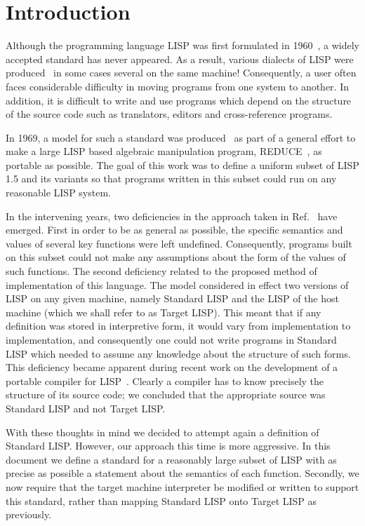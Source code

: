 \documentclass[11pt,letterpaper]{book}
\begin{document}
\section{Introduction}
Although the programming language LISP was first formulated in
1960~\cite{LISP1.5}, a widely accepted standard has never appeared. As
a result, various dialects of LISP were
produced~\cite{CDC-LISP,LISP/360,MACLISP,Interlisp,LISPF1,LISP1.6} in
some cases several on the same machine! Consequently, a user often
faces considerable difficulty in moving programs from one system to
another. In addition, it is difficult to write and use programs which
depend on the structure of the source code such as translators,
editors and cross-reference programs.

In 1969, a model for such a standard was produced~\cite{Hearn:69} as
part of a general effort to make a large LISP based algebraic
manipulation program, REDUCE~\cite{REDUCE3.3}, as portable as
possible.  The goal of this work was to define a uniform subset of
LISP 1.5 and its variants so that programs written in this subset
could run on any reasonable LISP system.

In the intervening years, two deficiencies in the approach taken in
Ref.~\cite{Hearn:69} have emerged. First in order to be as general as
possible, the specific semantics and values of several key functions
were left undefined. Consequently, programs built on this subset could
not make any assumptions about the form of the values of such
functions. The second deficiency related to the proposed method of
implementation of this language. The model considered in effect two
versions of LISP on any given machine, namely Standard LISP and the
LISP of the host machine (which we shall refer to as Target LISP).
This meant that if any definition was stored in interpretive form, it
would vary from implementation to implementation, and consequently one
could not write programs in Standard LISP which needed to assume any
knowledge about the structure of such forms. This deficiency became
apparent during recent work on the development of a portable compiler
for LISP~\cite{PLC}. Clearly a compiler has to know precisely the
structure of its source code; we concluded that the appropriate source
was Standard LISP and not Target LISP.

With these thoughts in mind we decided to attempt again a definition
of Standard LISP. However, our approach this time is more aggressive.
In this document we define a standard for a reasonably large subset of
LISP with as precise as possible a statement about the semantics of
each function. Secondly, we now require that the target machine
interpreter be modified or written to support this standard, rather
than mapping Standard LISP onto Target LISP as previously.
\end{document}
